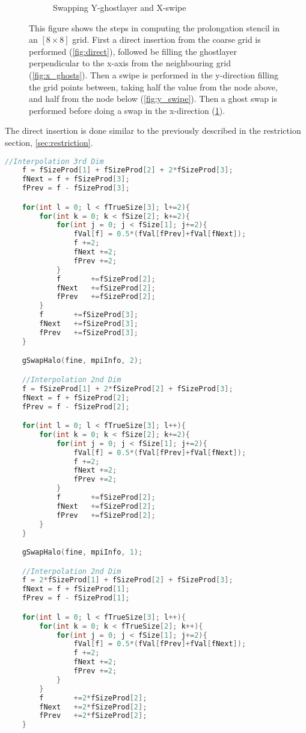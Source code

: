 \begin{figure}
\begin{subfigure}[b]{0.45\textwidth}
\begin{tikzpicture}[scale=0.5, auto,swap]
		\end{tikzpicture}
		\caption{Swapping Y-ghostlayer and X-swipe}
		\label{fig:x_swipe}
		\end{subfigure}
		\caption{This figure shows the steps in computing the prolongation stencil in an \([8\times8]\)
 				grid. First a direct insertion from the coarse grid is performed (\ref{fig:direct}),
				followed be filling the ghostlayer perpendicular to the x-axis from the neighbouring grid (\ref{fig:x_ghosts}).
				Then a swipe is performed in the y-direction filling the grid points between, taking half the value
				from the node above, and half from the node below (\ref{fig:y_swipe}). Then a ghost swap is performed before doing a swap in the x-direction (\ref{fig:x_swipe}).}
		\label{fig:prolongation}
	\end{figure}


	\newpage
	The direct insertion is done similar to the previously described in the restriction section, \ref{sec:restriction}.
	\begin{lstlisting}[language=c, caption = Codesnippet for the Z Y and X sweeps]
	//Interpolation 3rd Dim
	f = fSizeProd[1] + fSizeProd[2] + 2*fSizeProd[3];
	fNext = f + fSizeProd[3];
	fPrev = f - fSizeProd[3];

	for(int l = 0; l < fTrueSize[3]; l+=2){
		for(int k = 0; k < fSize[2]; k+=2){
			for(int j = 0; j < fSize[1]; j+=2){
				fVal[f] = 0.5*(fVal[fPrev]+fVal[fNext]);
				f +=2;
				fNext +=2;
				fPrev +=2;
			}
			f		+=fSizeProd[2];
			fNext 	+=fSizeProd[2];
			fPrev 	+=fSizeProd[2];
		}
		f		+=fSizeProd[3];
		fNext 	+=fSizeProd[3];
		fPrev 	+=fSizeProd[3];
	}

	gSwapHalo(fine, mpiInfo, 2);

	//Interpolation 2nd Dim
	f = fSizeProd[1] + 2*fSizeProd[2] + fSizeProd[3];
	fNext = f + fSizeProd[2];
	fPrev = f - fSizeProd[2];

	for(int l = 0; l < fTrueSize[3]; l++){
		for(int k = 0; k < fSize[2]; k+=2){
			for(int j = 0; j < fSize[1]; j+=2){
				fVal[f] = 0.5*(fVal[fPrev]+fVal[fNext]);
				f +=2;
				fNext +=2;
				fPrev +=2;
			}
			f		+=fSizeProd[2];
			fNext 	+=fSizeProd[2];
			fPrev 	+=fSizeProd[2];
		}
	}

	gSwapHalo(fine, mpiInfo, 1);

	//Interpolation 2nd Dim
	f = 2*fSizeProd[1] + fSizeProd[2] + fSizeProd[3];
	fNext = f + fSizeProd[1];
	fPrev = f - fSizeProd[1];

	for(int l = 0; l < fTrueSize[3]; l++){
		for(int k = 0; k < fTrueSize[2]; k++){
			for(int j = 0; j < fSize[1]; j+=2){
				fVal[f] = 0.5*(fVal[fPrev]+fVal[fNext]);
				f +=2;
				fNext +=2;
				fPrev +=2;
			}
		}
		f		+=2*fSizeProd[2];
		fNext 	+=2*fSizeProd[2];
		fPrev 	+=2*fSizeProd[2];
	}
	\end{lstlisting}

